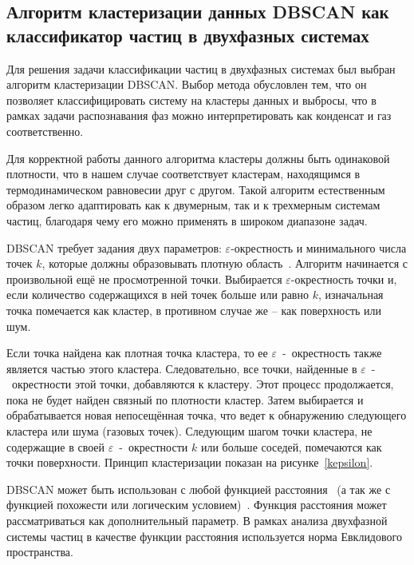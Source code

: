 \subsection{Алгоритм кластеризации данных DBSCAN как классификатор частиц в двухфазных системах}
\label{PRIMe-SubSecDBSCAN}

Для решения задачи классификации частиц в двухфазных системах был выбран алгоритм кластеризации DBSCAN.
Выбор метода обусловлен тем, что он позволяет классифицировать систему на кластеры данных и выбросы, что в рамках задачи распознавания фаз можно интерпретировать как конденсат и газ соответственно.

Для корректной работы данного алгоритма кластеры должны быть одинаковой плотности, что в нашем случае соответствует кластерам, находящимся в термодинамическом равновесии друг с другом.
Такой алгоритм естественным образом легко адаптировать как к двумерным, так и к трехмерным системам частиц, благодаря чему его можно применять в широком диапазоне задач.

DBSCAN требует задания двух параметров: $\varepsilon$-окрестность и минимального числа точек $k$, которые должны образовывать плотную область~\cite{schubert2017dbscan}.
Алгоритм начинается с произвольной ещё не просмотренной точки.
Выбирается $\varepsilon$-окрестность точки и, если количество содержащихся в ней точек больше или равно $k$, изначальная точка помечается как кластер, в противном случае же -- как поверхность или шум.

Если точка найдена как плотная точка кластера, то ее $\varepsilon$~-~окрестность также является частью этого кластера.
Следовательно, все точки, найденные в $\varepsilon$~-~окрестности этой точки, добавляются к кластеру.
Этот процесс продолжается, пока не будет найден связный по плотности кластер.
Затем выбирается и обрабатывается новая непосещённая точка, что ведет к обнаружению следующего кластера или шума (газовых точек).
Следующим шагом точки кластера, не содержащие в своей $\varepsilon$~-~окрестности $k$ или больше соседей, помечаются как точки поверхности.
Принцип кластеризации показан на рисунке~\ref{kepsilon}.

DBSCAN может быть использован с любой функцией расстояния~\cite{schubert2017dbscan} (а так же с функцией похожести или логическим условием)~\cite{10.1023/a:1009745219419}.
Функция расстояния может рассматриваться как дополнительный параметр.
В рамках анализа двухфазной системы частиц в качестве функции расстояния используется норма Евклидового пространства.

